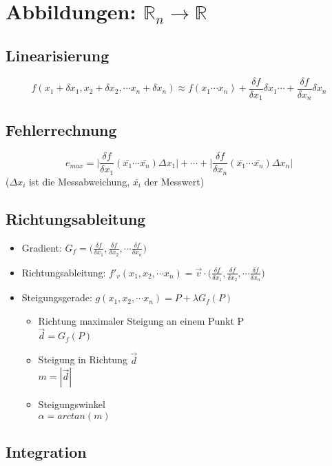 \section{Abbildungen: $\mathbb{R}_n \rightarrow \mathbb{R}$}

\subsection{Linearisierung}
\begin{equation*}
	f(x_1 + \delta x_1, x_2 + \delta x_2, \cdots x_n + \delta x_n) \approx f(x_1 \cdots x_n) + \frac{\delta f}{\delta x_1} \delta x_1 \cdots + \frac{\delta f}{\delta x_n} \delta x_n
\end{equation*}

\subsection{Fehlerrechnung}
\begin{equation*}
	e_{max} = \bigg | \frac{\delta f}{\delta x_1}(\bar{x_1} \cdots \bar{x_n}) \Delta x_1 \bigg | + \cdots + \bigg | \frac{\delta f}{\delta x_n}(\bar{x_1} \cdots \bar{x_n}) \Delta x_n \bigg |
\end{equation*}
($\Delta x_i$ ist die Messabweichung, $\bar{x_i}$ der Messwert)

\subsection{Richtungsableitung}
\begin{itemize}
	\item Gradient:
		$G_f = \big(\frac{\delta f}{\delta x_1}, \frac{\delta f}{\delta x_2}, \cdots \frac{\delta f}{\delta x_n}\big )$
	\item Richtungsableitung:
		$f'_v(x_1, x_2, \cdots x_n) = \vec{v} \cdot \big(\frac{\delta f}{\delta x_1}, \frac{\delta f}{\delta x_2}, \cdots \frac{\delta f}{\delta x_n}\big )$
	\item Steigungsgerade:
		$g(x_1, x_2, \cdots x_n) = P + \lambda G_f(P)$

		\begin{itemize}
			\item Richtung maximaler Steigung an einem Punkt P \\
			$\vec{d} = G_f(P)$
			\item Steigung in Richtung $\vec{d}$ \\ $m = |\vec{d}|$
			\item Steigungswinkel \\ $\alpha = arctan(m)$
		\end{itemize}
\end{itemize}

\subsection{Integration}
